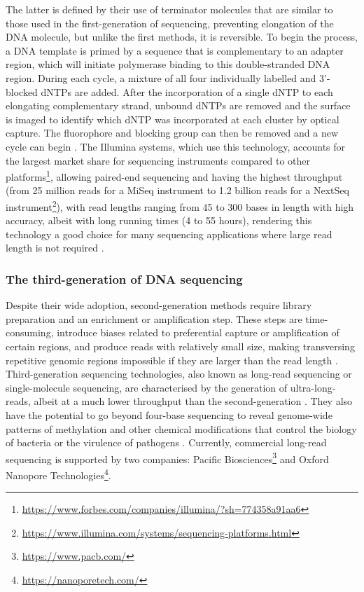 The latter is defined by their use of terminator molecules that are similar to those used in the first-generation of sequencing, preventing elongation of the DNA molecule, but unlike the first methods, it is reversible. 
To begin the process, a DNA template is primed by a sequence that is complementary to an adapter region, which will initiate polymerase binding to this double-stranded DNA region. 
During each cycle, a mixture of all four individually labelled and 3'-blocked dNTPs are added. 
After the incorporation of a single dNTP to each elongating complementary strand, unbound dNTPs are removed and the surface is imaged to identify which dNTP was incorporated at each cluster by optical capture. 
The fluorophore and blocking group can then be removed and a new cycle can begin \citep{goodwin_coming_2016}. 
The Illumina systems, which use this technology, accounts for the largest market share for sequencing instruments compared to other platforms\footnote{\url{https://www.forbes.com/companies/illumina/?sh=774358a91aa6}}, allowing paired-end sequencing and having the highest throughput (from 25 million reads for a MiSeq instrument to  1.2 billion reads for a NextSeq instrument\footnote{\url{https://www.illumina.com/systems/sequencing-platforms.html}}), with read lengths ranging from 45 to 300 bases in length with high accuracy, albeit with long running times (4 to 55 hours), rendering this technology a good choice for many sequencing applications where large read length is not required \citep{loman_performance_2012, gupta_chapter_2014, hagemann_overview_2015}.

\subsubsection{The third-generation of DNA sequencing} \label{ssec:3rd_gen_seq}

Despite their wide adoption, second-generation methods require library preparation and an enrichment or amplification step. 
These steps are time-consuming, introduce biases related to preferential capture or amplification of certain regions, and produce reads with relatively small size, making transversing repetitive genomic regions impossible if they are larger than the read length \citep{hagemann_overview_2015}. 
Third-generation sequencing technologies, also known as long-read sequencing or single-molecule sequencing, are characterised by the generation of ultra-long-reads, albeit at a much lower throughput than the second-generation \citep{hoang_long-reads-based_2022}. 
They also have the potential to go beyond four-base sequencing to reveal genome-wide patterns of methylation and other chemical modifications that control the biology of bacteria or the virulence of pathogens \citep{korlach_going_2012}. 
Currently, commercial long-read sequencing is supported by two companies: Pacific Biosciences\footnote{\url{https://www.pacb.com/}} and Oxford Nanopore Technologies\footnote{\url{https://nanoporetech.com/}}. 

